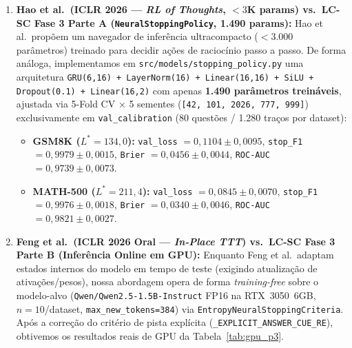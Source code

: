\documentclass[11pt,a4paper]{article}
\begin{document}
\begin{enumerate}[leftmargin=1.4em,itemsep=3pt]
  \item \textbf{Hao et al.\ (ICLR 2026 --- \emph{RL of Thoughts}, $<3$K params) vs.\ LC-SC Fase 3 Parte A (\texttt{NeuralStoppingPolicy}, 1.490 params):} Hao et al.\ propõem um navegador de inferência ultracompacto ($<3.000$ parâmetros) treinado para decidir ações de raciocínio passo a passo. De forma análoga, implementamos em \texttt{src/models/stopping\_policy.py} uma arquitetura \texttt{GRU(6,16) + LayerNorm(16) + Linear(16,16) + SiLU + Dropout(0.1) + Linear(16,2)} com apenas \textbf{1.490 parâmetros treináveis}, ajustada via 5-Fold CV $\times$ 5 sementes (\texttt{[42, 101, 2026, 777, 999]}) exclusivamente em \texttt{val\_calibration} (80 questões / 1.280 traços por dataset):
  \begin{itemize}[leftmargin=1.2em,itemsep=1pt]
    \item \textbf{GSM8K ($L^*=134{,}0$):} \texttt{val\_loss} $= 0{,}1104 \pm 0{,}0095$, \texttt{stop\_F1} $= 0{,}9979 \pm 0{,}0015$, \texttt{Brier} $= 0{,}0456 \pm 0{,}0044$, \texttt{ROC-AUC} $= 0{,}9739 \pm 0{,}0073$.
    \item \textbf{MATH-500 ($L^*=211{,}4$):} \texttt{val\_loss} $= 0{,}0845 \pm 0{,}0070$, \texttt{stop\_F1} $= 0{,}9976 \pm 0{,}0018$, \texttt{Brier} $= 0{,}0340 \pm 0{,}0046$, \texttt{ROC-AUC} $= 0{,}9821 \pm 0{,}0027$.
  \end{itemize}
  \item \textbf{Feng et al.\ (ICLR 2026 Oral --- \emph{In-Place TTT}) vs.\ LC-SC Fase 3 Parte B (Inferência Online em GPU):} Enquanto Feng et al.\ adaptam estados internos do modelo em tempo de teste (exigindo atualização de ativações/pesos), nossa abordagem opera de forma \emph{training-free} sobre o modelo-alvo (\texttt{Qwen/Qwen2.5-1.5B-Instruct} FP16 na RTX~3050~6GB, $n=10$/dataset, \texttt{max\_new\_tokens=384}) via \texttt{EntropyNeuralStoppingCriteria}. Após a correção do critério de pista explícita (\texttt{\_EXPLICIT\_ANSWER\_CUE\_RE}), obtivemos os resultados reais de GPU da Tabela~\ref{tab:gpu_p3}.
\end{enumerate}
\end{document}
